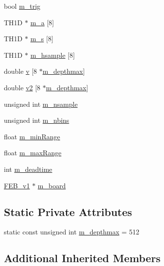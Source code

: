 \begin{DoxyCompactItemize}
bool \hyperlink{classAcquisition_a953bdc1bf56206b6df33b648af32a24f}{m\+\_\+trig}
\item 
T\+H1D $\ast$ \hyperlink{classAcquisition_aedfd2a4842b08fdf85176bf672030430}{m\+\_\+a} \mbox{[}8\mbox{]}
\item 
T\+H1D $\ast$ \hyperlink{classAcquisition_ad7f531c3d3fc58d1a2a5eab954db0ca7}{m\+\_\+s} \mbox{[}8\mbox{]}
\item 
T\+H1D $\ast$ \hyperlink{classAcquisition_ad0078b0c53eb14f13fdd16763df3be8e}{m\+\_\+hsample} \mbox{[}8\mbox{]}
\item 
double \hyperlink{classAcquisition_ac855680c9bb5f8f14d505d5f41f1a076}{v} \mbox{[}8 $\ast$\hyperlink{classAcquisition_a82cdfc89b37f20530bf112e13a5c5e5c}{m\+\_\+depthmax}\mbox{]}
\item 
double \hyperlink{classAcquisition_a8d2cd605d4982223356a14423d735c84}{v2} \mbox{[}8 $\ast$\hyperlink{classAcquisition_a82cdfc89b37f20530bf112e13a5c5e5c}{m\+\_\+depthmax}\mbox{]}
\item 
unsigned int \hyperlink{classAcquisition_a26d0f1a44309ffac49c365b7ee568ab2}{m\+\_\+nsample}
\item 
unsigned int \hyperlink{classAcquisition_a05bccdc4b9ada37beaeba8794ccef12d}{m\+\_\+nbins}
\item 
float \hyperlink{classAcquisition_a06b3ea027ebdcb15f64a6517ceb99b76}{m\+\_\+min\+Range}
\item 
float \hyperlink{classAcquisition_a45478629e9db582470b4b158edb46616}{m\+\_\+max\+Range}
\item 
int \hyperlink{classAcquisition_a5f7fe20506e7d860ed61935255adfe17}{m\+\_\+deadtime}
\item 
\hyperlink{classFEB__v1}{F\+E\+B\+\_\+v1} $\ast$ \hyperlink{classAcquisition_ad4820003ddd62f0ca886c2e6a3690120}{m\+\_\+board}
\end{DoxyCompactItemize}
\subsection*{Static Private Attributes}
\begin{DoxyCompactItemize}
\item 
static const unsigned int \hyperlink{classAcquisition_a82cdfc89b37f20530bf112e13a5c5e5c}{m\+\_\+depthmax} = 512
\end{DoxyCompactItemize}
\subsection*{Additional Inherited Members}


